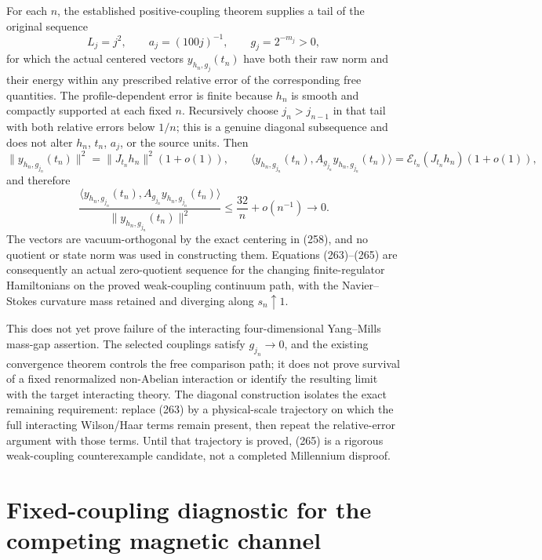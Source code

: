 \documentclass[11pt]{article}
\begin{document}
For each $n$, the established positive-coupling theorem supplies a tail of the original sequence
\[
 L_j=j^2,\qquad a_j=(100j)^{-1},\qquad g_j=2^{-m_j}>0,
 \tag{263}
\]
for which the actual centered vectors $y_{h_n,g_j}(t_n)$ have both their raw norm and their energy within any prescribed relative error of the corresponding free quantities.  The profile-dependent error is finite because $h_n$ is smooth and compactly supported at each fixed $n$.  Recursively choose $j_n>j_{n-1}$ in that tail with both relative errors below $1/n$; this is a genuine diagonal subsequence and does not alter $h_n$, $t_n$, $a_j$, or the source units.  Then
\[
 \|y_{h_n,g_{j_n}}(t_n)\|^2
   =\|J_{t_n}h_n\|^2(1+o(1)),\qquad
 \langle y_{h_n,g_{j_n}}(t_n),A_{g_{j_n}}y_{h_n,g_{j_n}}(t_n)\rangle
   =\mathcal E_{t_n}(J_{t_n}h_n)(1+o(1)),
 \tag{264}
\]
and therefore
\[
 \frac{\langle y_{h_n,g_{j_n}}(t_n),A_{g_{j_n}}y_{h_n,g_{j_n}}(t_n)\rangle}
  {\|y_{h_n,g_{j_n}}(t_n)\|^2}
 \le \frac{32}{n}+o(n^{-1})\longrightarrow0.
 \tag{265}
\]
The vectors are vacuum-orthogonal by the exact centering in (258), and no quotient or state norm was used in constructing them.  Equations (263)--(265) are consequently an actual zero-quotient sequence for the changing finite-regulator Hamiltonians on the proved weak-coupling continuum path, with the Navier--Stokes curvature mass retained and diverging along $s_n\uparrow1$.

This does not yet prove failure of the interacting four-dimensional Yang--Mills mass-gap assertion.  The selected couplings satisfy $g_{j_n}\to0$, and the existing convergence theorem controls the free comparison path; it does not prove survival of a fixed renormalized non-Abelian interaction or identify the resulting limit with the target interacting theory.  The diagonal construction isolates the exact remaining requirement: replace (263) by a physical-scale trajectory on which the full interacting Wilson/Haar terms remain present, then repeat the relative-error argument with those terms.  Until that trajectory is proved, (265) is a rigorous weak-coupling counterexample candidate, not a completed Millennium disproof.

\section{Fixed-coupling diagnostic for the competing magnetic channel}
\label{sec:fixed-coupling-diagnostic}
\end{document}
